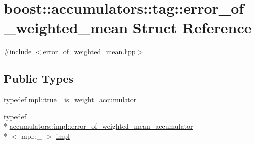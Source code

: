 \hypertarget{structboost_1_1accumulators_1_1tag_1_1error__of__weighted__mean}{\section{boost\-:\-:accumulators\-:\-:tag\-:\-:error\-\_\-of\-\_\-weighted\-\_\-mean Struct Reference}
\label{structboost_1_1accumulators_1_1tag_1_1error__of__weighted__mean}
}


{\ttfamily \#include $<$error\-\_\-of\-\_\-weighted\-\_\-mean.\-hpp$>$}

\subsection*{Public Types}
\begin{DoxyCompactItemize}
\item 
typedef mpl\-::true\-\_\- \hyperlink{structboost_1_1accumulators_1_1tag_1_1error__of__weighted__mean_a2e976c79a2aa15620a504bd4c87ee9bf}{is\-\_\-weight\-\_\-accumulator}
\item 
typedef \\*
\hyperlink{structboost_1_1accumulators_1_1impl_1_1error__of__weighted__mean__accumulator}{accumulators\-::impl\-::error\-\_\-of\-\_\-weighted\-\_\-mean\-\_\-accumulator}\\*
$<$ mpl\-::\-\_ $>$ \hyperlink{structboost_1_1accumulators_1_1tag_1_1error__of__weighted__mean_a9e77d0056f0d9b30589fbf40c57cf25d}{impl}
\end{DoxyCompactItemize}


